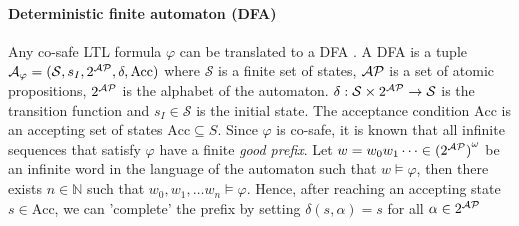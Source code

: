 \paragraph*{Deterministic finite automaton (DFA)} Any co-safe LTL formula $\varphi$ can be translated to a DFA \cite{kupferman2001model}. A DFA is a tuple $\mathcal{A}_{\varphi} = (\mathcal{S},s_I,2^{\mathcal{AP}}, \delta,\textrm{Acc})$ where $\mathcal{S}$ is a finite set of states, $\mathcal{AP}$ is a set of atomic propositions, $2^{\mathcal{AP}}$ is the alphabet of the automaton. $\delta: \mathcal{S} \times 2^{\mathcal{AP}} \rightarrow \mathcal{S} $ is the transition function and $s_I \in \mathcal{S}$ is the initial state. The acceptance condition $\textrm{Acc}$ is an accepting set of states $\textrm{Acc} \subseteq S$. Since $\varphi$ is co-safe, it is known that all infinite sequences that satisfy $\varphi$ have a finite \emph{good prefix}. Let $w = w_0 w_1 \dots \in {({2^{\mathcal{AP}}})}^{\omega}$ be an infinite word in the language of the automaton such that $w \vDash \varphi$, then there exists $n\in \mathbb{N}$ such that $w_0,w_1,\dots w_n \vDash \varphi$. Hence, after reaching an accepting state $s \in \textrm{Acc}$, we can 'complete' the prefix by setting $\delta(s,\alpha) = s$ for all $\alpha \in 2^{\mathcal{AP}}$



